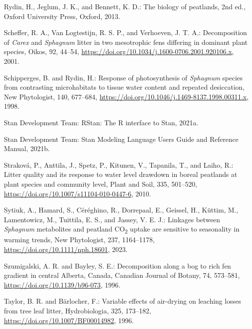 \documentclass[
  12pt,
]{article}
\newlength{\cslhangindent}
\newlength{\cslentryspacingunit} %
\newenvironment{CSLReferences}[2] %
 {%
  \setlength{\parindent}{0pt}
  \ifodd #1
  \let\oldpar\par
  \def\par{\hangindent=\cslhangindent\oldpar}
  \fi
  \setlength{\parskip}{#2\cslentryspacingunit}
 }%
 {}
\begin{document}
\begin{CSLReferences}{0}{0}
\leavevmode{}%
Rydin, H., Jeglum, J. K., and Bennett, K. D.: The biology of peatlands, 2nd ed., Oxford University Press, Oxford, 2013.

\leavevmode{}%
Scheffer, R. A., Van Logtestijn, R. S. P., and Verhoeven, J. T. A.: Decomposition of {\emph{Carex}} and {\emph{Sphagnum}} litter in two mesotrophic fens differing in dominant plant species, Oikos, 92, 44--54, \url{https://doi.org/10.1034/j.1600-0706.2001.920106.x}, 2001.

\leavevmode{}%
Schipperges, B. and Rydin, H.: Response of photosynthesis of {\emph{Sphagnum}} species from contrasting microhabitats to tissue water content and repeated desiccation, New Phytologist, 140, 677--684, \url{https://doi.org/10.1046/j.1469-8137.1998.00311.x}, 1998.

\leavevmode{}%
Stan Development Team: {RStan}: The {R} interface to {Stan}, 2021a.

\leavevmode{}%
Stan Development Team: Stan {Modeling Language Users Guide} and {Reference Manual}, 2021b.

\leavevmode{}%
Straková, P., Anttila, J., Spetz, P., Kitunen, V., Tapanila, T., and Laiho, R.: Litter quality and its response to water level drawdown in boreal peatlands at plant species and community level, Plant and Soil, 335, 501--520, \url{https://doi.org/10.1007/s11104-010-0447-6}, 2010.

\leavevmode{}%
Sytiuk, A., Hamard, S., Céréghino, R., Dorrepaal, E., Geissel, H., Küttim, M., Lamentowicz, M., Tuittila, E. S., and Jassey, V. E. J.: Linkages between {\emph{Sphagnum}} metabolites and peatland { \textsc{} }{\textsc{CO}}{\textsc{\textsubscript{2}}}{ \textsc{} } uptake are sensitive to seasonality in warming trends, New Phytologist, 237, 1164--1178, \url{https://doi.org/10.1111/nph.18601}, 2023.

\leavevmode{}%
Szumigalski, A. R. and Bayley, S. E.: Decomposition along a bog to rich fen gradient in central {Alberta}, {Canada}, Canadian Journal of Botany, 74, 573--581, \url{https://doi.org/10.1139/b96-073}, 1996.

\leavevmode{}%
Taylor, B. R. and Bärlocher, F.: Variable effects of air-drying on leaching losses from tree leaf litter, Hydrobiologia, 325, 173--182, \url{https://doi.org/10.1007/BF00014982}, 1996.


\end{CSLReferences}
\end{document}
